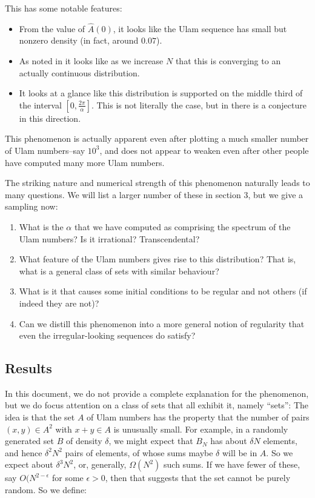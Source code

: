 \documentclass{article}
\theoremstyle{definition}
\theoremstyle{remark}
\numberwithin{equation}{section}
\begin{document}
This has some notable features: 

\begin{itemize}
\item From the value of $\widehat{A}(0)$, it looks like the Ulam
  sequence has small but nonzero density (in fact, around $0.07$).

\item As noted in \cite{steinerberger:preprint} it looks like as we increase $N$
  that this is converging to an actually continuous distribution.

\item It looks at a glance like this distribution is supported on the
  middle third of the interval $[0,\frac{2\pi}\alpha]$.  This is not
  literally the case, but in \cite{gibbs:preprint} there is a
  conjecture in this direction.
\end{itemize}

This phenomenon is actually apparent even after plotting a much
smaller number of Ulam numbers--say $10^3$, and does not appear to
weaken even after other people have computed many more Ulam numbers.

The striking nature and numerical strength of this phenomenon
naturally leads to many questions.  We will list a larger number of
these in section 3, but we give a sampling now: 

\begin{enumerate}
\item What is the $\alpha$ that we have computed as comprising the
  spectrum of the Ulam numbers?  Is it irrational?  Transcendental?

\item What feature of the Ulam numbers gives rise to this
  distribution?  That is, what is a general class of sets with similar
  behaviour?

\item What is it that causes some initial conditions to be regular and
  not others (if indeed they are not)?

\item Can we distill this phenomenon into a more general notion of
  regularity that even the irregular-looking sequences do satisfy?
\end{enumerate}

\subsection{Results}

In this document, we do not provide a complete explanation for the
phenomenon, but we do focus attention on a class of sets that all
exhibit it, namely ``\relevant sets'': The idea is that the set $A$ of
Ulam numbers has the property that the number of pairs
$(x, y) \in A^2$ with $x + y \in A$ is unusually small.  For example,
in a randomly generated set $B$ of density $\delta$, we might expect
that $B_N$ has about $\delta N$ elements, and hence $\delta^2 N^2$
pairs of elements, of whose sums maybe $\delta$ will be in $A$.  So we
expect about $\delta^3 N^2$, or, generally, $\Omega(N^2)$ such sums.
If we have fewer of these, say $O(N^{2-\epsilon}$ for some
$\epsilon > 0$, then that suggests that the set cannot be purely
random.  So we define: 
\end{document}
